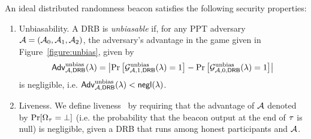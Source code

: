 \begin{definition}
An ideal distributed randomness beacon satisfies the following security properties:
\begin{enumerate}
\item Unbiasability.
A DRB is \textit{unbiasable} if, for any PPT adversary $\mathcal{A} = (\mathcal{A}_0, \mathcal{A}_1, \mathcal{A}_2)$, the adversary's advantage in the game given in Figure~\ref{figure:unbias}, given by
\begingroup\makeatletter\def\f@size{8}\check@mathfonts
\begin{equation*}
\mathsf{Adv}^\text{unbias}_{\mathcal{A}, \mathsf{DRB}}(\lambda) = \left|\Pr\left[\mathcal{G}^\text{unbias}_{\mathcal{A}, 1, \mathsf{DRB}}(\lambda) = 1\right] - \Pr\left[\mathcal{G}^\text{unbias}_{\mathcal{A}, 0, \mathsf{DRB}}(\lambda) = 1\right]\right|
\end{equation*}\endgroup
is negligible, i.e. $\mathsf{Adv}^\text{unbias}_{\mathcal{A}, \mathsf{DRB}}(\lambda) < \mathsf{negl}(\lambda)$.

\item Liveness. We define liveness~\cite{cherniaeva2019homomorphic} by requiring that the advantage of $\mathcal{A}$ denoted by $\Pr[\Omega_\tau = \text{$\perp$}]$ (i.e. the probability that the beacon output at the end of \epoch $\tau$ is null) is negligible, given a DRB that runs among honest participants and $\mathcal{A}$.


\end{enumerate}
\end{definition}
